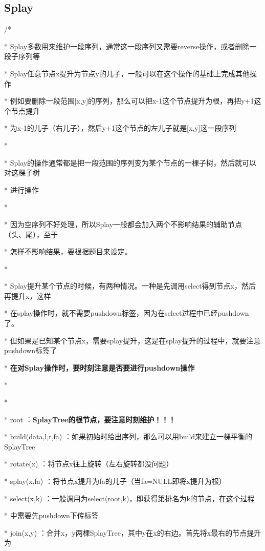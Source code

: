 \subsection{Splay}
/* \par
 * Splay多数用来维护一段序列，通常这一段序列又需要reverse操作，或者删除一段子序列等 \par
 * Splay任意节点x提升为节点y的儿子，一般可以在这个操作的基础上完成其他操作 \par
 * 例如要删除一段范围[x,y]的序列，那么可以把x-1这个节点提升为根，再把y+1这个节点提升 \par
 * 为x-1的儿子（右儿子），然后y+1这个节点的左儿子就是[x,y]这一段序列 \par
 * \par
 * Splay的操作通常都是把一段范围的序列变为某个节点的一棵子树，然后就可以对这棵子树 \par
 * 进行操作 \par
 * \par
 * 因为空序列不好处理，所以Splay一般都会加入两个不影响结果的辅助节点（头、尾），至于 \par
 * 怎样不影响结果，要根据题目来设定。 \par
 * \par
 * Splay提升某个节点的时候，有两种情况。一种是先调用select得到节点x，然后再提升x，这样 \par
 * 在splay操作时，就不需要pushdown标签，因为在select过程中已经pushdown了。 \par
 * 但如果是已知某个节点x，需要splay提升，这是在splay提升的过程中，就要注意pushdown标签了 \par
 * \textbf{在对Splay操作时，要时刻注意是否要进行pushdown操作} \par
 * \par
 * \par
 * root               ：\textbf{SplayTree的根节点，要注意时刻维护！！！} \par
 * build(data,l,r,fa) ：如果初始时给出序列，那么可以用build来建立一棵平衡的SplayTree \par
 * rotate(x)          ：将节点x往上旋转（左右旋转都没问题） \par
 * splay(x,fa)           ：将节点x提升为fa的儿子（当fa=NULL即将x提升为根） \par
 * select(x,k)           ：一般调用为select(root,k)，即获得第排名为k的节点，在这个过程 \par
 *                        中需要先pushdown下传标签 \par
 * join(x,y)          ：合并x，y两棵SplayTree，其中y在x的右边。首先将x最右的节点提升为 \par
